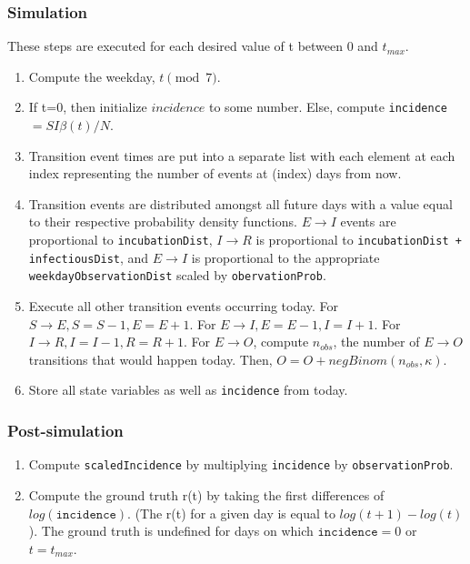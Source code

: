 \documentclass{article}
\newcommand{\code}[1]{\texttt{#1}}
\begin{document}
\subsubsection{Simulation}
These steps are executed for each desired value of t between 0 and $t_{max}$.
\begin{enumerate}
    
    \item Compute the weekday, $t \pmod 7$.
    
    \item If t=0, then initialize $incidence$ to some number. Else, compute \code{incidence} $= SI\beta(t)/N$.
    
    \item Transition event times are put into a separate list with each element at each index representing the number of events at (index) days from now. 

    \item Transition events are distributed amongst all future days with a value equal to their respective probability density functions. $E \rightarrow I$ events are proportional to \code{incubationDist}, $I \rightarrow R$ is proportional to \code{incubationDist + infectiousDist}, and $E \rightarrow I$ is proportional to the appropriate \linebreak \code{weekdayObservationDist} scaled by \code{obervationProb}.

    \item Execute all other transition events occurring today. For $S \rightarrow E, S=S-1, E=E+1$. For $E \rightarrow I, E=E-1, I=I+1$. For $I \rightarrow R, I = I-1, R = R+1$. For $E \rightarrow O$, compute $n_{obs}$, the number of $E \rightarrow O$ transitions that would happen today. Then, $O = O + negBinom(n_{obs}, \kappa)$.    
    
    \item Store all state variables as well as \code{incidence} from today.
    
\end{enumerate}

\subsubsection{Post-simulation}
\begin{enumerate}
    \item Compute \code{scaledIncidence} by multiplying \code{incidence} by \code{observationProb}.
    \item Compute the ground truth r(t) by taking the first differences of $log(\code{incidence})$. (The r(t) for a given day is equal to $log(t+1) - log(t)$). The ground truth is undefined for days on which $\code{incidence}=0$ or $t=t_{max}$. 
\end{enumerate}
\end{document}
